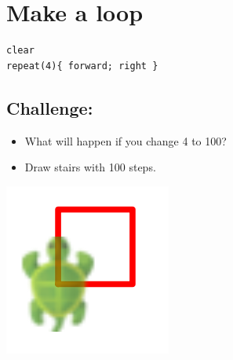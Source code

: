 \chapter{Make a loop}
\begin{multicols}{2}

\begin{lstlisting}[basicstyle={\ttfamily\fontsize{30}{36}\selectfont},numbers=none]
clear
repeat(4){ forward; right }
\end{lstlisting}
        
\section*{\color{BrickRed}Challenge:}


\begin{itemize}

\item {What will happen if you change 4 to 100?}
\item {Draw stairs with 100 steps.}

\end{itemize}



\columnbreak

\begin{center}
\includegraphics{../img/square.png}
\end{center}

\end{multicols}

